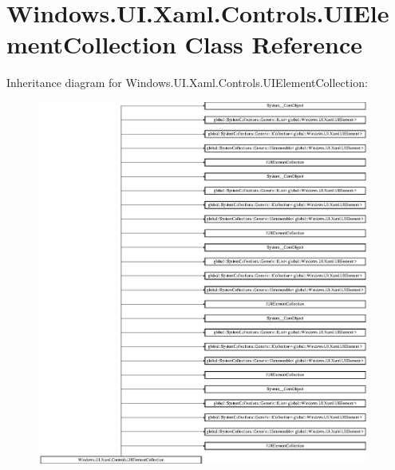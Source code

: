 \hypertarget{class_windows_1_1_u_i_1_1_xaml_1_1_controls_1_1_u_i_element_collection}{}\section{Windows.\+U\+I.\+Xaml.\+Controls.\+U\+I\+Element\+Collection Class Reference}
\label{class_windows_1_1_u_i_1_1_xaml_1_1_controls_1_1_u_i_element_collection}
Inheritance diagram for Windows.\+U\+I.\+Xaml.\+Controls.\+U\+I\+Element\+Collection\+:\begin{figure}[H]
\begin{center}
\leavevmode
\includegraphics[height=12.000000cm]{class_windows_1_1_u_i_1_1_xaml_1_1_controls_1_1_u_i_element_collection}
\end{center}
\end{figure}
